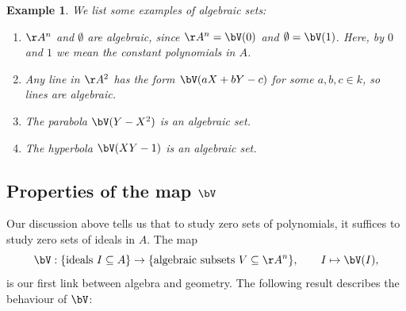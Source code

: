 \documentclass[12pt]{amsart}
\theoremstyle{plain}
\newtheorem{example}[theorem]{Example}
\begin{document}
\begin{example}\label{algsetex}
We list some examples of algebraic sets:
\begin{enumerate}[\itshape(i)]
\item
$\AA^n$ and $\emptyset$ are algebraic, since $\AA^n = \bV(0)$ and $\emptyset = \bV(1)$.
Here, by $0$ and $1$ we mean the constant polynomials in $A$.

\item
Any line in $\AA^2$ has the form $\bV(aX+bY-c)$ for some $a, b, c \in k$, so lines are algebraic.

\item
The parabola $\bV(Y-X^2)$ is an algebraic set.

\item
The hyperbola $\bV(XY - 1)$ is an algebraic set.
\end{enumerate}
\end{example}

\subsection{Properties of the map $\bV$}
Our discussion above tells us that to study zero sets of polynomials, it suffices to study zero sets of ideals in $A$.
The map
$$\bV : \{\text{ideals } I \subseteq A\} \to \{\text{algebraic subsets } V \subseteq \AA^n\}, \qquad I \mapsto \bV(I),$$
is our first link between algebra and geometry.
The following result describes the behaviour of $\bV$:
\end{document}
